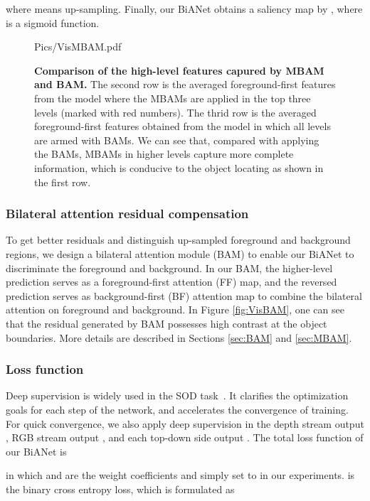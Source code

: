 \documentclass[journal]{IEEEtran}
\newcommand{\figref}[1]{Figure \ref{#1}}
\begin{document}
where  means up-sampling.
Finally, our BiANet obtains a saliency map by , where  is a sigmoid function.

\begin{figure}[t]
	\centering
	\begin{overpic}[width=.98\columnwidth]{Pics/VisMBAM.pdf} 
	\end{overpic}
\caption{
		\textbf{Comparison of the high-level features capured by MBAM and BAM.}
		The second row is the averaged foreground-first features from the model where the MBAMs are applied in the top three levels (marked with red numbers).
		The thrid row is the averaged foreground-first features obtained from the model in which all levels are armed with BAMs.
		We can see that, compared with applying the BAMs, MBAMs in higher levels capture more complete information, 
		which is conducive to the object locating as shown in the first row.
	}
	\vspace{-8pt}
	\label{fig:VisMBAM}
\end{figure}


\subsubsection{Bilateral attention residual compensation}
To get better residuals and distinguish up-sampled foreground and background regions, we design a bilateral attention module (BAM) to enable our BiANet to discriminate the foreground and background.
In our BAM, the higher-level prediction serves as a foreground-first attention (FF) map, 
and the reversed prediction serves as background-first (BF) attention map to combine the bilateral attention on foreground and background.
In \figref{fig:VisBAM}, one can see that the residual generated by BAM possesses high contrast at the object boundaries.
More details are described in Sections \ref{sec:BAM} and \ref{sec:MBAM}.

\subsubsection{Loss function}
Deep supervision is widely used in the SOD task~\cite{feng2019attentive,hou2019deeply}.
It clarifies the optimization goals for each step of the network, and accelerates the convergence of training.
For quick convergence,
we also apply deep supervision in the depth stream output , 
RGB stream output , and each top-down side output .
The total loss function of our BiANet is

in which  and  are the weight coefficients
and simply set to  in our experiments.  is the binary cross entropy loss, which is formulated as
\end{document}
